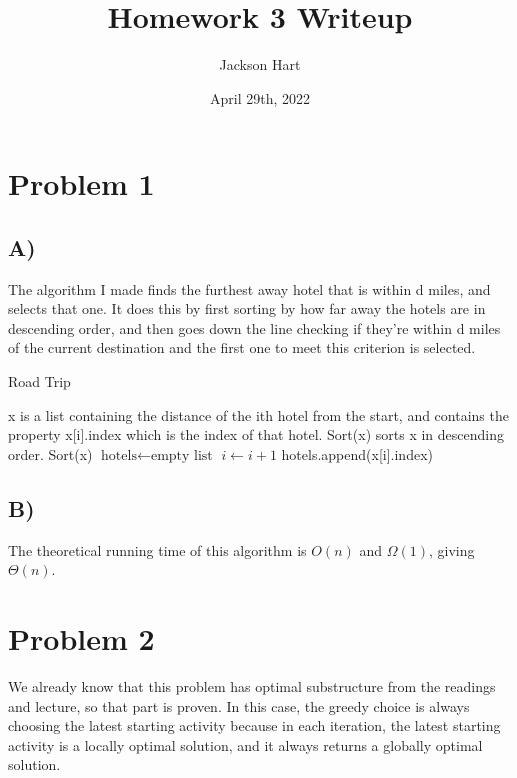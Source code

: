 \documentclass[12pt, letterpaper]{article}
\title{Homework 3 Writeup}
\author{Jackson Hart}
\date{April 29th, 2022}
\begin{document}
\maketitle

\section*{Problem 1}
\subsection*{A)}
The algorithm I made finds the furthest away hotel that is within d miles, and selects that one. It does this by first sorting by how far away the hotels are in descending order, and then goes down the line checking if they’re within d miles of the current destination and the first one to meet this criterion is selected.

\begin{algorithm}
\caption{Road Trip}
\begin{algorithmic}
\Require x is a list containing the distance of the ith hotel from the start, and contains the property x[i].index which is the index of that hotel.
\Require Sort(x) sorts x in descending order.
\State Sort(x)
\State $\text{hotels} \gets \text{empty list}$
		\State $i \gets i + 1$
	\EndWhile
	\State hotels.append(x[i].index)
\EndFor
\end{algorithmic}
\end{algorithm}

\subsection*{B)}
The theoretical running time of this algorithm is $O(n)$ and $\Omega(1)$, giving $\Theta(n)$.

\section*{Problem 2}
We already know that this problem has optimal substructure from the readings and lecture, so that part is proven. In this case, the greedy choice is always choosing the latest starting activity because in each iteration, the latest starting activity is a locally optimal solution, and it always returns a globally optimal solution.
\end{document}
